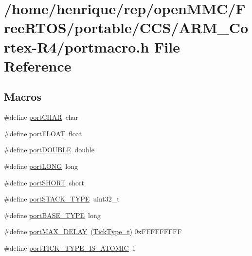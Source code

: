 \hypertarget{CCS_2ARM__Cortex-R4_2portmacro_8h}{\section{/home/henrique/rep/open\-M\-M\-C/\-Free\-R\-T\-O\-S/portable/\-C\-C\-S/\-A\-R\-M\-\_\-\-Cortex-\/\-R4/portmacro.h File Reference}
\label{CCS_2ARM__Cortex-R4_2portmacro_8h}
}
\subsection*{Macros}
\begin{DoxyCompactItemize}
\item 
\#define \hyperlink{CCS_2ARM__Cortex-R4_2portmacro_8h_add0bdbfef5abf241c7774f68bde42f1d}{port\-C\-H\-A\-R}~char
\item 
\#define \hyperlink{CCS_2ARM__Cortex-R4_2portmacro_8h_a1bbe1ef117ec274ef919e0a930c888ac}{port\-F\-L\-O\-A\-T}~float
\item 
\#define \hyperlink{CCS_2ARM__Cortex-R4_2portmacro_8h_a4711ce186a903a14bc8ea7c8650b4f61}{port\-D\-O\-U\-B\-L\-E}~double
\item 
\#define \hyperlink{CCS_2ARM__Cortex-R4_2portmacro_8h_a6bbebff6020ac333ab6ec2ffd7f77001}{port\-L\-O\-N\-G}~long
\item 
\#define \hyperlink{CCS_2ARM__Cortex-R4_2portmacro_8h_a42e62d5881b12ff2a5c659576c64d003}{port\-S\-H\-O\-R\-T}~short
\item 
\#define \hyperlink{CCS_2ARM__Cortex-R4_2portmacro_8h_ab0a294066ac7369b8f59a52d9491a92c}{port\-S\-T\-A\-C\-K\-\_\-\-T\-Y\-P\-E}~uint32\-\_\-t
\item 
\#define \hyperlink{CCS_2ARM__Cortex-R4_2portmacro_8h_a1ebe82d24d764ae4e352f7c3a9f92c01}{port\-B\-A\-S\-E\-\_\-\-T\-Y\-P\-E}~long
\item 
\#define \hyperlink{CCS_2ARM__Cortex-R4_2portmacro_8h_a72723ba1e4a85ca14f25c2b9e066613d}{port\-M\-A\-X\-\_\-\-D\-E\-L\-A\-Y}~(\hyperlink{Flsh186_2prtmacro_8h_aa69c48c6e902ce54f70886e6573c92a9}{Tick\-Type\-\_\-t}) 0x\-F\-F\-F\-F\-F\-F\-F\-F\-F
\item 
\#define \hyperlink{CCS_2ARM__Cortex-R4_2portmacro_8h_a62e53bc6d3fa5c4bf4e65ab2752930f3}{port\-T\-I\-C\-K\-\_\-\-T\-Y\-P\-E\-\_\-\-I\-S\-\_\-\-A\-T\-O\-M\-I\-C}~1
\item 

\end{DoxyCompactItemize}
